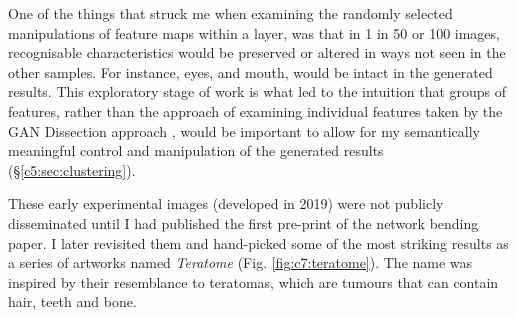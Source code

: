 One of the things that struck me when examining the randomly selected manipulations of feature maps within a layer, was that in 1 in 50 or 100 images, recognisable characteristics would be preserved or altered in ways not seen in the other samples. 
For instance, eyes, and mouth, would be intact in the generated results. This exploratory stage of work is what led to the intuition that groups of features, rather than the approach of examining individual features taken by the GAN Dissection approach \citep{bau2019semantic}, would be important to allow for my semantically meaningful control and manipulation of the generated results (\S \ref{c5:sec:clustering}). 

These early experimental images (developed in 2019) were not publicly disseminated until I had published the first pre-print of the network bending paper.
I later revisited them and hand-picked some of the most striking results as a series of artworks named \textit{Teratome} \citeyearpar{broad2020teratome}  (Fig. \ref{fig:c7:teratome}). 
The name was inspired by their resemblance to teratomas, which are tumours that can contain hair, teeth and bone. 

